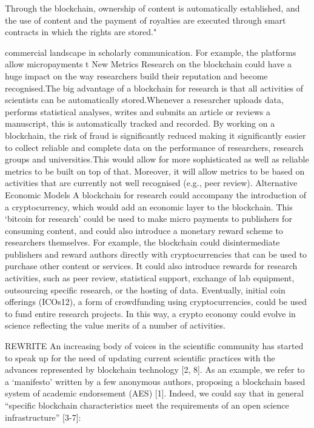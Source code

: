 \documentclass[runningheads]{llncs}
\begin{document}
Through the blockchain, ownership of content is automatically established, and the use of content and the payment of royalties are executed through smart contracts in which the rights are stored."

commercial landscape in scholarly communication. For example, the platforms allow micropayments t
New Metrics Research on the blockchain could have a huge impact on the way researchers build their reputation and become recognised.The big advantage of a blockchain for research is that all activities of scientists can be automatically stored.Whenever a researcher uploads data, performs statistical analyses, writes and submits an article or reviews a manuscript, this is automatically tracked and recorded. By working on a blockchain, the risk of fraud is significantly reduced making it significantly easier to collect reliable and complete data on the performance of researchers, research groups and universities.This would allow for more sophisticated as well as reliable metrics to be built on top of that. Moreover, it will allow metrics to be based on activities that are currently not well recognised (e.g., peer review).
Alternative Economic Models
A blockchain for research could accompany the introduction of a cryptocurrency, which would add an economic layer to the blockchain. This ‘bitcoin for research’ could be used to make micro payments to publishers for consuming content, and could also introduce a monetary reward scheme to researchers themselves. For example, the blockchain could disintermediate publishers and reward authors directly with cryptocurrencies that can be used to purchase other content or services. It could also introduce rewards for research activities, such as peer review, statistical support, exchange of lab equipment, outsourcing specific research, or the hosting of data. Eventually, initial coin offerings (ICOs12), a form of crowdfunding using cryptocurrencies, could be used to fund entire research projects. In this way, a crypto economy could evolve in science reflecting the value merits of a number of activities.

REWRITE
An increasing body of voices in the scientific community has started to speak up for the need of updating current scientific practices with the advances represented by blockchain technology [2, 8]. As an example, we refer to a ‘manifesto’ written by a few anonymous authors, proposing a blockchain based system of academic endorsement (AES) [1]. Indeed, we could say that in general “specific blockchain characteristics meet the requirements of an open science infrastructure” [3-7]:
\end{document}
